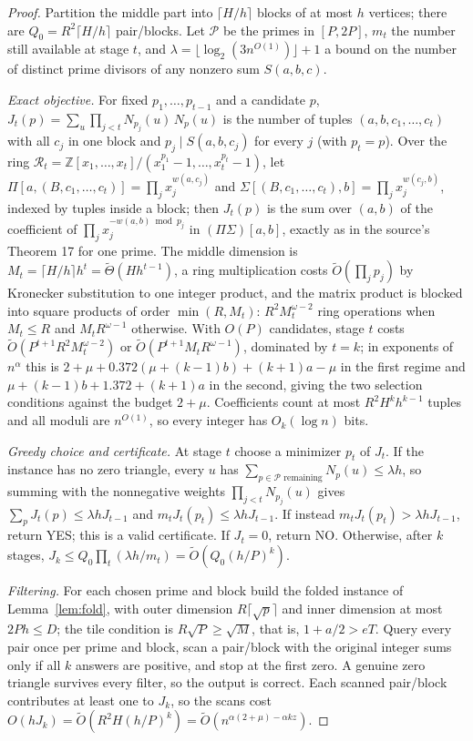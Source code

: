 \documentclass[11pt]{article}
\newcommand{\softO}{\widetilde O}
\begin{document}
\begin{proof}
Partition the middle part into $\lceil H/h\rceil$ blocks of at most $h$
vertices; there are $Q_0=R^2\lceil H/h\rceil$ pair/blocks. Let $\mathcal P$
be the primes in $[P,2P]$, $m_t$ the number still available at stage $t$,
and $\lambda=\lfloor\log_2(3n^{O(1)})\rfloor+1$ a bound on the number of
distinct prime divisors of any nonzero sum $S(a,b,c)$.

\emph{Exact objective.} For fixed $p_1,\ldots,p_{t-1}$ and a candidate $p$,
$J_t(p)=\sum_u\prod_{j<t}N_{p_j}(u)\,N_p(u)$ is the number of tuples
$(a,b,c_1,\ldots,c_t)$ with all $c_j$ in one block and $p_j\mid S(a,b,c_j)$
for every $j$ (with $p_t=p$). Over the ring
$\mathcal R_t=\mathbb Z[x_1,\ldots,x_t]/(x_1^{p_1}-1,\ldots,x_t^{p_t}-1)$,
let $\Pi[a,(B,c_1,\ldots,c_t)]=\prod_jx_j^{w(a,c_j)}$ and
$\Sigma[(B,c_1,\ldots,c_t),b]=\prod_jx_j^{w(c_j,b)}$, indexed by tuples inside
a block; then $J_t(p)$ is the sum over $(a,b)$ of the coefficient of
$\prod_jx_j^{-w(a,b)\bmod p_j}$ in $(\Pi\Sigma)[a,b]$, exactly as in the
source's Theorem 17 for one prime. The middle dimension is
$M_t=\lceil H/h\rceil h^t=\widetilde\Theta(Hh^{t-1})$, a ring multiplication
costs $\softO(\prod_jp_j)$ by Kronecker substitution to one integer product,
and the matrix product is blocked into square products of order $\min(R,M_t)$:
$R^2M_t^{\omega-2}$ ring operations when $M_t\le R$ and $M_tR^{\omega-1}$
otherwise. With $O(P)$ candidates, stage $t$ costs
$\softO(P^{t+1}R^2M_t^{\omega-2})$ or $\softO(P^{t+1}M_tR^{\omega-1})$,
dominated by $t=k$; in exponents of $n^\alpha$ this is
$2+\mu+0.372(\mu+(k-1)b)+(k+1)a-\mu$ in the first regime and
$\mu+(k-1)b+1.372+(k+1)a$ in the second, giving the two selection
conditions against the budget $2+\mu$. Coefficients count at most
$R^2H^kh^{k-1}$ tuples and all moduli are $n^{O(1)}$, so every integer has
$O_k(\log n)$ bits.

\emph{Greedy choice and certificate.} At stage $t$ choose a minimizer
$p_t$ of $J_t$. If the instance has no zero triangle, every $u$ has
$\sum_{p\in\mathcal P\text{ remaining}}N_p(u)\le\lambda h$, so summing with
the nonnegative weights $\prod_{j<t}N_{p_j}(u)$ gives
$\sum_pJ_t(p)\le\lambda hJ_{t-1}$ and $m_tJ_t(p_t)\le\lambda hJ_{t-1}$.
If instead $m_tJ_t(p_t)>\lambda hJ_{t-1}$, return YES; this is a valid
certificate. If $J_t=0$, return NO. Otherwise, after $k$ stages,
$J_k\le Q_0\prod_t(\lambda h/m_t)=\widetilde O(Q_0(h/P)^k)$.

\emph{Filtering.} For each chosen prime and block build the folded instance
of Lemma~\ref{lem:fold}, with outer dimension $R\lceil\sqrt p\rceil$ and
inner dimension at most $2Ph\le D$; the tile condition is
$R\sqrt P\ge\sqrt M$, that is, $1+a/2>eT$. Query every pair once per prime
and block, scan a pair/block with the original integer sums only if all $k$
answers are positive, and stop at the first zero. A genuine zero triangle
survives every filter, so the output is correct. Each scanned pair/block
contributes at least one to $J_k$, so the scans cost
$O(hJ_k)=\widetilde O(R^2H(h/P)^k)=\softO(n^{\alpha(2+\mu)-\alpha kz})$.


\end{proof}
\end{document}
